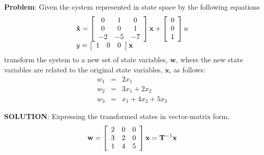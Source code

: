 \textbf{Problem}: Given the system represented in state space by the following equations
\[
\begin{array}{l}
 {\bf{\dot x}} = \left[ {\begin{array}{*{20}c}
   0 & 1 & 0  \\
   0 & 0 & 1  \\
   { - 2} & { - 5} & { - 7}  \\
\end{array}} \right]{\bf{x}} + \left[ {\begin{array}{*{20}c}
   0  \\
   0  \\
   1  \\
\end{array}} \right]u \\ 
 y = \left[ {\begin{array}{*{20}c}
   1 & 0 & 0  \\
\end{array}} \right]{\bf{x}} \\ 
 \end{array}
\]
transform the system to a new set of state variables, $\mathbf{w}$, where the new state variables are related to the original state variables, $\mathbf{x}$, as follows:
\begin{eqnarray*}
	w_1 & = & 2x_1 \\
	w_2 & = & 3x_1 + 2x_2 \\
	w_3 & = & x_1 + 4x_2 + 5x_3
\end{eqnarray*}

\textbf{SOLUTION}: Expressing the transformed states in vector-matrix form,
\[
{\bf{w}} = \left[ {\begin{array}{*{20}c}
   2 & 0 & 0  \\
   3 & 2 & 0  \\
   1 & 4 & 5  \\
\end{array}} \right]{\bf{x}} = {\bf{T}}^{ - 1} {\bf{x}}
\]


